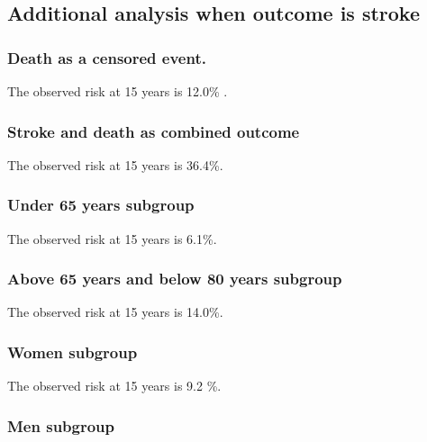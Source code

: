 \documentclass[
]{book}
\begin{document}
\hypertarget{additional-analysis-when-outcome-is-stroke}{%
\subsection{Additional analysis when outcome is stroke}\label{additional-analysis-when-outcome-is-stroke}}

\hypertarget{death-as-a-censored-event.}{%
\subsubsection{Death as a censored event.}\label{death-as-a-censored-event.}}

The observed risk at 15 years is 12.0\% .

\hypertarget{stroke-and-death-as-combined-outcome}{%
\subsubsection{Stroke and death as combined outcome}\label{stroke-and-death-as-combined-outcome}}

The observed risk at 15 years is 36.4\%.

\hypertarget{under-65-years-subgroup}{%
\subsubsection{Under 65 years subgroup}\label{under-65-years-subgroup}}

The observed risk at 15 years is 6.1\%.

\hypertarget{above-65-years-and-below-80-years-subgroup}{%
\subsubsection{Above 65 years and below 80 years subgroup}\label{above-65-years-and-below-80-years-subgroup}}

The observed risk at 15 years is 14.0\%.

\hypertarget{women-subgroup}{%
\subsubsection{Women subgroup}\label{women-subgroup}}

The observed risk at 15 years is 9.2 \%.

\hypertarget{men-subgroup}{%
\subsubsection{Men subgroup}\label{men-subgroup}}
\end{document}
